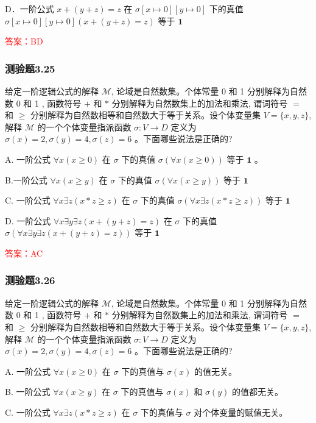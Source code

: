 \documentclass[UTF8, heading=true]{ctexart}
\begin{document}
D．一阶公式 $x+(y+z)=z$ 在 $\sigma[x \mapsto 0][y \mapsto 0]$ 下的真值 $\sigma[x \mapsto 0][y \mapsto 0](x+(y+z)=z)$ 等于 $\mathbf{1}$

\textcolor{red}{答案：BD}

\subsubsection{测验题3.25}

给定一阶逻辑公式的解释 $\mathcal{M}$, 论域是自然数集。个体常量 0 和 1 分别解释为自然数 0 和 1 , 函数符号 $+$ 和 $*$ 分别解释为自然数集上的加法和乘法, 谓词符号 $=$ 和 $\geq$ 分别解释为自然数相等和自然数大于等于关系。设个体变量集 $V=\{x, y, z\}$, 解释 $\mathcal{M}$ 的一个个体变量指派函数 $\sigma: V \rightarrow D$ 定义为 $\sigma(x)=2, \sigma(y)=4, \sigma(z)=6$ 。下面哪些说法是正确的?

A. 一阶公式 $\forall x(x \geq 0)$ 在 $\sigma$ 下的真值 $\sigma(\forall x(x \geq 0))$ 等于 $\mathbf{1}$ 。

B.一阶公式 $\forall x(x \geq y)$ 在 $\sigma$ 下的真值 $\sigma(\forall x(x \geq y))$ 等于 $\mathbf{1}$

C. 一阶公式 $\forall x \exists z(x * z \geq z)$ 在 $\sigma$ 下的真值 $\sigma(\forall x \exists z(x * z \geq z))$ 等于 $\mathbf{1}$

D. 一阶公式 $\forall x \exists y \exists z(x+(y+z)=z)$ 在 $\sigma$ 下的真值 $\sigma(\forall x \exists y \exists z(x+(y+z)=z))$ 等于 $\mathbf{1}$

\textcolor{red}{答案：AC}

\subsubsection{测验题3.26}

给定一阶逻辑公式的解释 $\mathcal{M}$, 论域是自然数集。个体常量 0 和 1 分别解释为自然数 0 和 1 , 函数符号 $+$ 和 $*$ 分别解释为自然数集上的加法和乘法, 谓词符号 $=$ 和 $\geq$ 分别解释为自然数相等和自然数大于等于关系。设个体变量集 $V=\{x, y, z\}$, 解释 $\mathcal{M}$ 的一个个体变量指派函数 $\sigma: V \rightarrow D$ 定义为 $\sigma(x)=2, \sigma(y)=4, \sigma(z)=6$ 。下面哪些说法是正确的?

A. 一阶公式 $\forall x(x \geq 0)$ 在 $\sigma$ 下的真值与 $\sigma(x)$ 的值无关。

B.  一阶公式 $\forall x(x \geq y)$ 在 $\sigma$ 下的真值与 $\sigma(x)$ 和 $\sigma(y)$ 的值都无关。

C. 一阶公式 $\forall x \exists z(x * z \geq z)$ 在 $\sigma$ 下的真值与 $\sigma$ 对个体变量的赋值无关。
\end{document}
